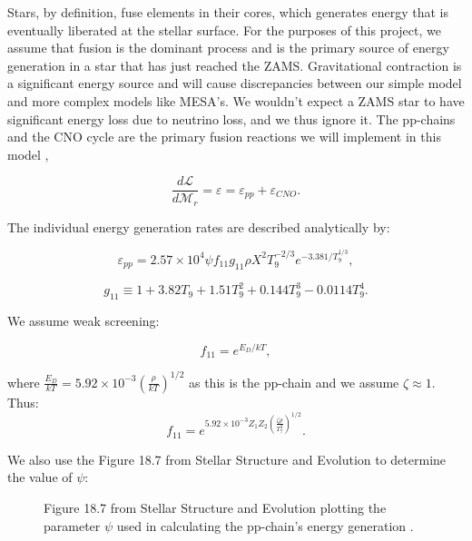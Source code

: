\documentclass[twocolumn]{aastex631}
\begin{document}
Stars, by definition, fuse elements in their cores, which generates energy that is eventually liberated at the stellar surface. For the purposes of this project, we assume that fusion is the dominant process and is the primary source of energy generation in a star that has just reached the ZAMS. Gravitational contraction is a significant energy source and will cause discrepancies between our simple model and more complex models like MESA's. We wouldn't expect a ZAMS star to have significant energy loss due to neutrino loss, and we thus ignore it. The pp-chains and the CNO cycle are the primary fusion reactions we will implement in this model \citep{stelstrucev}, 

\begin{equation}
	\frac{d\mathcal{L}}{d\mathcal{M}_r} = \varepsilon = \varepsilon_{pp} + \varepsilon_{CNO}.
\end{equation}

The individual energy generation rates are described analytically by:

\begin{equation}
\varepsilon_{pp} = 2.57 \times 10^4 \psi f_{11} g_{11}\rho X^2T_9^{-2/3}e^{-3.381/T_9^{1/3}},
\end{equation}

\begin{equation} 
g_{11} \equiv 1 + 3.82T_9 + 1.51T_9^2 + 0.144T_9^3 - 0.0114T_9^4.
\end{equation}

We assume weak screening:

\begin{equation} 
f_{11} = e^{E_D/kT},
\end{equation}

\noindent where $\frac{E_D}{kT} = 5.92 \times 10^{-3} \left(\frac{\rho}{kT}\right)^{1/2}$ as this is the pp-chain and we assume $\zeta \approx 1$. Thus:
\begin{equation}
	f_{11}  = e^{5.92 \times 10^{-3} Z_1 Z_2 \left(\frac{\zeta\rho}{T_7^3}\right)^{1/2}}.
\end{equation}

We also use the Figure 18.7 from Stellar Structure and Evolution to determine the value of $\psi$:

\begin{figure}[ht!]
	\caption{Figure 18.7 from Stellar Structure and Evolution plotting the parameter $\psi$ used in calculating the pp-chain's energy generation \citep{stelstrucev}.}
\end{figure}
\end{document}
